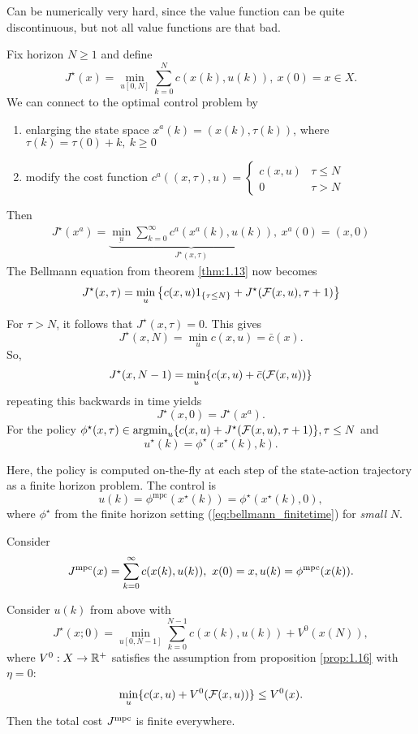 Can be numerically very hard, since the value function can be quite discontinuous, but not all value functions are that bad.

 Fix horizon \(N\geq 1\) and define 
\[J^\star(x)=\min_{u[0,N]}\sum_{k=0}^N c(x(k),u(k)),\ x(0)=x\in X.\]
We can connect to the optimal control problem by 
\begin{enumerate}
    \item enlarging the state space \(x^a(k)=(x(k),\tau(k))\), where \(\tau(k)=\tau(0)+k,\ k\geq 0\)
    \item modify the cost function \(c^a((x,\tau),u)=\begin{cases}
        c(x,u) & \tau \leq N\\
        0 & \tau >N
    \end{cases}\)
\end{enumerate}
Then 
\begin{align*}
    J^\star(x^a)=\underbrace{\min_{\underbar{u}}\sum_{k=0}^\infty c^a(x^a(k),u(k))}_{J^\star(x,\tau)},\ x^a(0)=(x,0)
\end{align*}
The Bellmann equation from theorem \ref{thm:1.13} now becomes 
\begin{equation}\label{eq:bellmann_finitetime}
    J^\star(x,\tau)=\min_u\left\{c(x,u)1_{\{\tau \leq N\}}+J^\star(\mathcal{F}(x,u),\tau+1)\right\}
\end{equation}

For \(\tau>N\), it follows that \(J^\star(x,\tau)=0\).
This gives 
\[J^\star(x,N)=\min_{u}c(x,u)=\bar{c}(x).\]
So, \[J^\star(x,N-1)=\min_{u}\{c(x,u)+\bar{c}(\mathcal{F}(x,u))\}\]
repeating this backwards in time yields 
\[J^\star(x,0)=J^\star(x^a).\]
For the policy \(\phi^\star(x,\tau)\in \operatorname*{\text{argmin}}_{u}\{c(x,u)+J^\star(\mathcal{F}(x,u),\tau+1)\},\tau \leq N\)
and \[u^\star(k)=\phi^\star(x^\star(k),k).\]


Here, the policy is computed on-the-fly at 
each step of the state-action trajectory as a finite horizon 
problem. 
The control is 
\[u(k)=\phi^{\text{mpc}}(x^\star(k))=\phi^\star(x^\star(k),0),\]
where \(\phi^\star\) from the finite horizon setting (\ref{eq:bellmann_finitetime})
for \textit{small} \(N\).

Consider 
\[J{^{\text{mpc}}}(x)=\sum_{k=0}^\infty c(x(k),u(k)),\ x(0)=x,u(k)=\phi{^{\text{mpc}}}(x(k)).\]

\begin{proposition}\label{prop:1.19}
    Consider \(u(k)\) from above with 
    \[J^\star(x;0)=\min_{u[0,N-1]}\sum_{k=0}^{N-1}c(x(k),u(k))+V^0(x(N)),\]
    where \(V^0:X\to\mathbb{R}^+\) satisfies the assumption from proposition \ref{prop:1.16}
    with \(\eta=0\):
    \[\min_{u}\{c(x,u)+V^0(\mathcal{F}(x,u))\}\leq V^0(x).\]
    Then the total cost \(J{^{\text{mpc}}}\) is finite everywhere.
\end{proposition}

